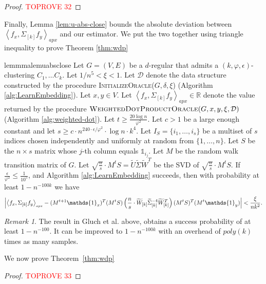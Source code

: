 \documentclass[letterpaper,11pt]{article}
\newcommand{\R}{\mathbb{R}}
\theoremstyle{plain}
\theoremstyle{definition}
\theoremstyle{remark}
\newtheorem{remark}[theorem]{Remark}
\newcommand{\adp}[1]
  {\ensuremath{\left\langle #1 \right\rangle_{\scriptscriptstyle apx}}}
\newcommand{\mycolor}[1]{\textcolor{black}{#1}}
\begin{document}
\begin{proof}\textcolor{red}{TOPROVE 32}\end{proof}


Finally, Lemma \ref{lem:u-abs-close} bounds the absolute deviation between $\adp{f_x, \Sigma_{[k]} f_y}$
and our estimator. We put the two together using triangle inequality to prove Theorem 
\ref{thm:wdp} 

\begin{restatable}{lemmma}{lemuabsclose}\label{lem:u-abs-close}
	Let $G=(V,E)$ be a $d$-regular that admits a $(k,\varphi,\epsilon)$-clustering $C_1, \ldots C_k$. Let
	$1/n^5 < \xi < 1$. Let $\mathcal{D}$ denote the  data structure constructed by the procedure \textsc{InitializeOracle($G,\delta,\xi$)} (Algorithm \ref{alg:LearnEmbedding}). 
	Let $x,y\in V$. Let $\adp{f_x, \Sigma_{[k]}f_y}\in \R$ denote the value returned by the procedure $\textsc{WeightedDotProductOracle}(G,x,y,  \xi, \mathcal{D})$ (Algorithm \ref{alg:weighted-dot}).
	Let  $t\geq  \frac{20\log n}{\varphi^2}$. Let $c>1$ be a large enough constant and let 
	$s\geq c\cdot n^{240\cdot\epsilon / \varphi^2}\cdot \log n \cdot k^{4}$. Let 
	$I_S=\{i_1,\ldots, i_s\}$ be a multiset of $s$ indices chosen independently and uniformly at random from
	$\{1,\dots,n\}$. Let $S$ be the $n\times s$ matrix whose $j$-th column equals $\mathds{1}_{i_j}$. 
	Let $M$ be the random walk transition matrix of $G$. Let 
	$\sqrt{\frac{n}{s}} \cdot M^tS=\widetilde{U}\widetilde{\Sigma}\widetilde{W}^T$  be  the SVD of 
	$\sqrt{\frac{n}{s}} \cdot M^tS$. If $\frac{\epsilon}{\varphi^2}\leq \frac{1}{10^5}$, and Algorithm 
	\ref{alg:LearnEmbedding} succeeds,  then with probability at least $1-n^{-100k}$ we have
	\[\left|\adp{f_{x},\Sigma_{[k]} f_y} - (M^{t+1}\mathds{1}_{x})^T  (M^tS)\left(\frac{n}{s}\cdot\widetilde{W}_{[k]} \widetilde{\Sigma}^{-4}_{[k]} \widetilde{W}^T_{[k]}\right) (M^tS)^T (M^{t}\mathds{1}_{y}) \right|<
		\frac{\xi }{\mycolor{nk^2}} \text{.}
	\]
\end{restatable}


\begin{remark}
	The result in Gluch et al. above, obtains a success probability of at least $1 - n^{-100}$. It
	can be improved to $1 - n^{-100k}$ with an overhead of $poly(k)$ times as many samples.
\end{remark}

We now prove Theorem~\ref{thm:wdp}

\begin{proof}\textcolor{red}{TOPROVE 33}\end{proof}
 
\end{document}
